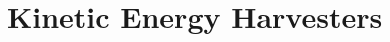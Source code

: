 \documentclass[11pt,english,british]{report}
\begin{document}


\setcounter{chapter}{2}

\chapter{Kinetic Energy Harvesters}\label{chap:3}



\pagebreak{}



\fancyhead[LO,RE]{\slshape \nouppercase{\leftmark}}


\end{document}
